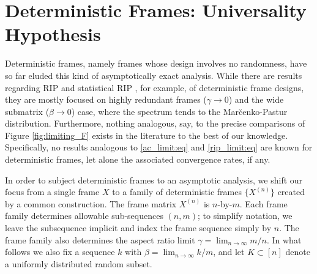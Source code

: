 \documentclass[a4paper,12pt]{article}
\newcommand{\m}{m}
\begin{document}

%
%
%
%
%


\section*{Deterministic Frames: Universality Hypothesis}
\label{sec:deterministic_frames}

Deterministic frames, namely
frames whose design involves no randomness, have so far eluded this kind of
asymptotically exact analysis. 
While
there are results regarding RIP \cite{Bandiera,Fickus} and statistical RIP
\cite{Caulderbank-STRIP,Gurevich2009,Mazumdar}, for example, of deterministic
frame designs, they are mostly focused on highly redundant frames ($\gamma \rightarrow 0$)
and the wide submatrix ($\beta \rightarrow 0$) case, where the spectrum tends
to the Mar\u cenko-Pastur distribution. Furthermore, nothing analogous, say, to the precise comparisons of Figure
\ref{fig:limiting_F} exists in the literature to the best of our knowledge. 
Specifically, no results analogous to \eqref{ac_limit:eq} and \eqref{rip_limit:eq}
are known for deterministic frames, 
let alone the associated convergence rates, if any.

In order to subject deterministic frames to an asymptotic analysis, we shift our
focus from a single frame $X$ to a family of deterministic frames $\{X^{(n)}\}$
created by a common construction. The frame matrix $X^{(n)}$ is $n$-by-$m$.
Each frame family determines allowable sub-sequences $(n,m)$; to
simplify notation, we leave the subsequence implicit and index the frame
sequence simply by $n$. The frame family
also determines the aspect ratio limit $\gamma=\lim_{n\to\infty} \m/n$.
In what follows we also fix a sequence $k$ with $\beta=\lim_{n\to\infty}
k/\m $,
and let $K\subset [n]$ denote a uniformly distributed random subset.
\end{document}
